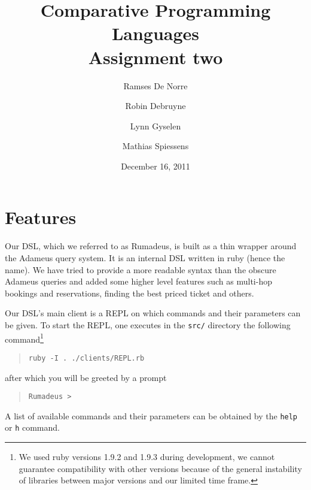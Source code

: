 \documentclass[11pt,pdftex,oneside]{article}
\title{Comparative Programming Languages\\ {\Large Assignment two}}
\author{Ramses De Norre \and Robin Debruyne
        \and Lynn Gyselen \and Mathias Spiessens}
\date{December 16, 2011}
\begin{document}
\maketitle
\thispagestyle{empty}

\section{Features}
Our DSL, which we referred to as Rumadeus, is built as a thin wrapper
around the Adameus query system.
It is an internal DSL written in ruby (hence the name).
We have tried to provide a more readable syntax than the obscure Adameus
queries and added some higher level features such as multi-hop bookings and
reservations, finding the best priced ticket and others.

Our DSL's main client is a REPL on which commands and their parameters can
be given.
To start the REPL, one executes in the {\tt src/} directory the following
command\footnote{We used ruby versions 1.9.2 and 1.9.3 during development,
we cannot guarantee compatibility with other versions because of the
general instability of libraries between major versions and our limited
time frame.}
\begin{quote}
  {\tt ruby -I . ./clients/REPL.rb}
\end{quote}
after which you will be greeted by a prompt
\begin{quote}
  {\tt Rumadeus >}
\end{quote}
A list of available commands and their parameters can be obtained by the
{\tt help} or {\tt h} command.
\end{document}
